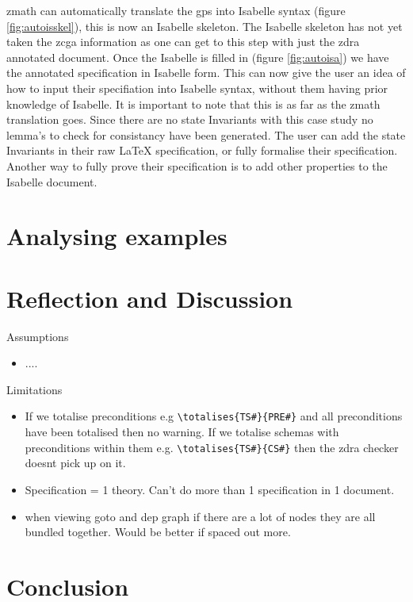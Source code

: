 \Gls{zmath} can automatically translate the \gls{gps} into Isabelle syntax (figure \ref{fig:autoisskel}), this is now an Isabelle skeleton. The Isabelle skeleton has not yet taken the \gls{zcga} information as one can get to this step with just the \gls{zdra} annotated document. Once the Isabelle is filled in (figure \ref{fig:autoisa}) we have the annotated specification in Isabelle form. This can now give the user an idea of how to input their specifiation into Isabelle syntax, without them having prior knowledge of Isabelle. It is important to note that this is as far as the \gls{zmath} translation goes. Since there are no state Invariants with this case study no lemma's to check for consistancy have been generated. The user can add the state Invariants in their raw \LaTeX{} specification, or fully formalise their specification. Another way to fully prove their specification is to add other properties to the Isabelle document.

\section{Analysing examples}



\section{Reflection and Discussion}

Assumptions

\begin{itemize}
\item ....
\end{itemize}

Limitations

\begin{itemize}
\item If we totalise preconditions e.g \verb|\totalises{TS#}{PRE#}| and all preconditions have been totalised then no warning. If we totalise schemas with preconditions within them e.g. \verb|\totalises{TS#}{CS#}| then the \gls{zdra} checker doesnt pick up on it.

\item Specification = 1 theory. Can't do more than 1 specification in 1 document.

\item when viewing goto and dep graph if there are a lot of nodes they are all bundled together. Would be better if spaced out more.
\end{itemize}

\section{Conclusion}
